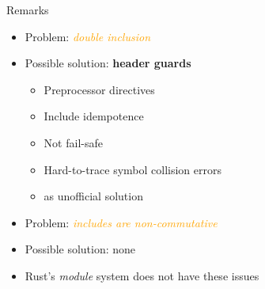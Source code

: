 \begin{frame}[fragile]{Remarks \hfill {\footnotesize \currentname}}


    \begin{itemize}

        \item Problem: \textit{\textcolor{orange}{double inclusion}}

        \item Possible solution: \textbf{header guards}
            \begin{itemize}
                \item Preprocessor directives
                \item Include idempotence
                \item Not fail-safe
                \item Hard-to-trace symbol collision errors
                \item {} as unofficial solution
            \end{itemize}

        \vspace*{8pt}\item Problem: \textit{\textcolor{orange}{includes are non-commutative}}
        \item Possible solution: none

        \vspace*{8pt}\item Rust's \textit{module} system does not have these issues

    \end{itemize}

    \vfill

\end{frame}

